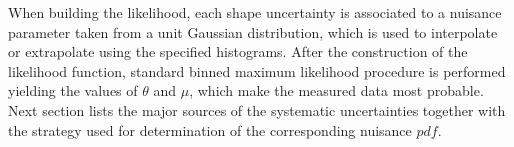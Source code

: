 When building the likelihood, each shape uncertainty is associated to a nuisance parameter taken from a unit Gaussian distribution, which is used to interpolate or extrapolate using the specified histograms. After the construction of the likelihood function, standard binned maximum likelihood procedure is performed yielding the values of $\theta$ and $\mu$, which make the measured data most probable. Next section lists the major sources of the systematic uncertainties together with the strategy used for determination of the corresponding nuisance $pdf$.                                                                                                                                                                                                                                                                                                                                                                                                                                                                                                                                                                                                                                                                                                                                                                                                                                                                                                                                                                                                                                                                                                                                                                                                                                                                                                                                                                                                                                                                                                                                                                                                                                                                                                                                                                                                                                                                                                                                                                                                                                                                                                                                                                                                                                                                                                                                                        




